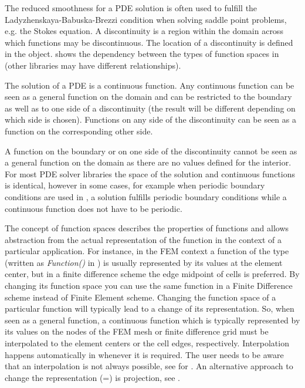 The reduced smoothness for a PDE solution is often used to fulfill the
Ladyzhenskaya-Babuska-Brezzi condition\cite{LBB} when solving saddle point
problems, e.g. the Stokes equation.
A discontinuity is a region within the domain across
which functions may be discontinuous.
The location of a discontinuity is defined in the \Domain object.
 shows the dependency between the types of function spaces
in \finley (other libraries may have different relationships).

The solution of a PDE is a continuous function. Any continuous function can
be seen as a general function on the domain and can be restricted to the
boundary as well as to one side of a discontinuity (the result will be
different depending on which side is chosen). Functions on any side of the
discontinuity can be seen as a function on the corresponding other side.

A function on the boundary or on one side of the discontinuity cannot be seen
as a general function on the domain as there are no values defined for the
interior. For most PDE solver libraries the space of the solution and
continuous functions is identical, however in some cases, for example when
periodic boundary conditions are used in \finley, a solution fulfills periodic
boundary conditions while a continuous function does not have to be periodic.

The concept of function spaces describes the properties of functions and
allows abstraction from the actual representation of the function in the
context of a particular application. For instance, in the FEM context a
function of the \Function type (written as \emph{Function()} in )
is usually represented by its values at the element center,
but in a finite difference scheme the edge midpoint of cells is preferred.
By changing its function space you can use the same function in a Finite
Difference scheme instead of Finite Element scheme.
Changing the function space of a particular function will typically lead to
a change of its representation.
So, when seen as a general function, a continuous function which is typically
represented by its values on the nodes of the FEM mesh or finite difference
grid must be interpolated to the element centers or the cell edges,
respectively. Interpolation happens automatically in \escript whenever it is
required. The user needs to be aware that an
interpolation is not always possible, see  for \finley.
An alternative approach to change the representation (=\FunctionSpace) is
projection, see .

